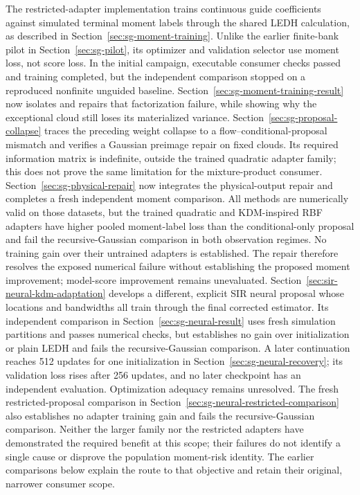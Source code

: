 \documentclass[11pt]{article}
\begin{document}
The restricted-adapter implementation trains continuous guide coefficients against
simulated terminal moment labels through the shared LEDH calculation, as
described in Section~\ref{sec:sg-moment-training}. Unlike the earlier
finite-bank pilot in Section~\ref{sec:sg-pilot}, its optimizer and validation
selector use moment loss, not score loss. In the initial campaign, executable
consumer checks passed and training completed, but the independent comparison
stopped on a reproduced
nonfinite unguided baseline. Section~\ref{sec:sg-moment-training-result}
now isolates and repairs that factorization failure, while showing why the
exceptional cloud still loses its materialized variance. Section~\ref{sec:sg-proposal-collapse}
traces the preceding weight collapse to a flow--conditional-proposal mismatch
and verifies a Gaussian preimage repair on fixed clouds. Its required
information matrix is indefinite, outside the trained quadratic adapter
family; this does not prove the same limitation for the mixture-product
consumer. Section~\ref{sec:sg-physical-repair} now integrates the
physical-output repair and completes a fresh independent moment comparison.
All methods are numerically valid on those datasets, but the trained quadratic
and KDM-inspired RBF adapters have higher pooled moment-label loss than the conditional-only proposal
and fail the recursive-Gaussian comparison in both observation regimes.
No training gain over their untrained adapters is established. The repair
therefore resolves the exposed numerical failure without establishing the
proposed moment improvement; model-score improvement remains unevaluated.
Section~\ref{sec:sir-neural-kdm-adaptation} develops a different, explicit SIR
neural proposal whose locations and bandwidths all train through the final
corrected estimator. Its independent comparison in
Section~\ref{sec:sg-neural-result} uses fresh simulation partitions and passes
numerical checks, but establishes no gain over initialization or plain LEDH
and fails the recursive-Gaussian comparison. A later continuation reaches 512
updates for one initialization in Section~\ref{sec:sg-neural-recovery}; its
validation loss rises after 256 updates, and no later checkpoint has an
independent evaluation. Optimization adequacy remains unresolved. The fresh
restricted-proposal comparison
in Section~\ref{sec:sg-neural-restricted-comparison} also establishes no adapter
training gain and fails the recursive-Gaussian comparison. Neither the larger
family nor the restricted adapters have demonstrated the required benefit at
this scope; their failures do not identify a single cause or disprove the
population moment-risk identity.
The earlier comparisons below explain the route to that objective and retain
their original, narrower consumer scope.
\end{document}
